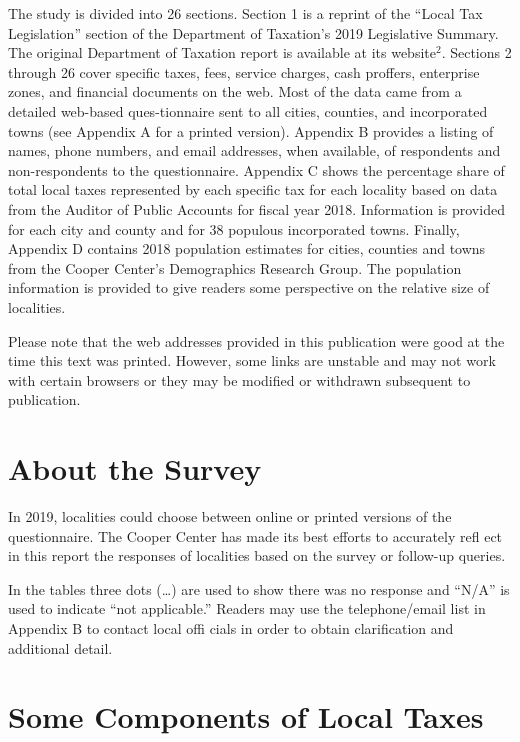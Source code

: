\documentclass[
]{book}
\begin{document}
The study is divided into 26 sections. Section 1 is a reprint of the ``Local Tax Legislation'' section of the Department of Taxation's 2019 Legislative Summary. The original Department of Taxation report is available at its website\(^2\). Sections 2 through 26 cover specific taxes, fees, service charges, cash proffers, enterprise zones, and financial documents on the web. Most of the data came from a detailed web-based ques-tionnaire sent to all cities, counties, and incorporated towns (see Appendix A for a printed version). Appendix B provides a listing of names, phone numbers, and email addresses, when available, of respondents and non-respondents to the questionnaire. Appendix C shows the percentage share of total local taxes represented by each specific tax for each locality based on data from the Auditor of Public Accounts for fiscal year 2018. Information is provided for each city and county and for 38 populous incorporated towns. Finally, Appendix D contains 2018 population estimates for cities, counties and towns from the Cooper Center's Demographics Research Group. The population information is provided to give readers some perspective on the relative size of localities.

Please note that the web addresses provided in this publication were good at the time this text was printed. However, some links are unstable and may not work with certain browsers or they may be modified or withdrawn subsequent to publication.

\hypertarget{about-the-survey}{%
\section{About the Survey}\label{about-the-survey}}

In 2019, localities could choose between online or printed versions of the questionnaire. The Cooper Center has made its best efforts to accurately refl ect in this report the responses of localities based on the survey or follow-up queries.

In the tables three dots (\ldots) are used to show there was no response and ``N/A'' is used to indicate ``not applicable.'' Readers may use the telephone/email list in Appendix B to contact local offi cials in order to obtain clarification and additional detail.

\hypertarget{some-components-of-local-taxes}{%
\section{Some Components of Local Taxes}\label{some-components-of-local-taxes}}
\end{document}
